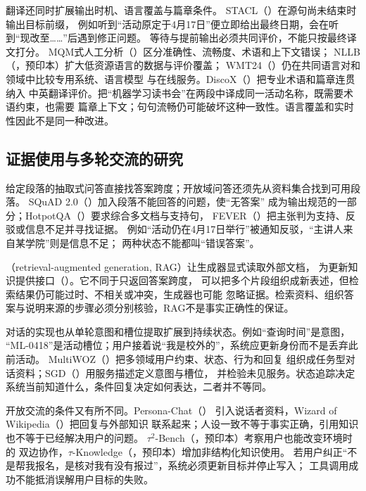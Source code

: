 翻译还同时扩展输出时机、语言覆盖与篇章条件。
STACL（\citeyear{nlp-intro-ma2019stacl}）在源句尚未结束时输出目标前缀，
例如听到“活动原定于4月17日”便立即给出最终日期，会在听到“现改至……”后遇到修正问题。
等待与提前输出必须共同评价，不能只按最终译文打分。
MQM式人工分析（\citeyear{nlp-intro-freitag2021}）区分准确性、流畅度、术语和上下文错误；
NLLB（\citeyear{nlp-intro-nllb2022}，预印本）扩大低资源语言的数据与评价覆盖；
WMT24（\citeyear{nlp-intro-kocmi2024}）仍在共同语言对和领域中比较专用系统、语言模型
与在线服务。DiscoX（\citeyear{nlp-intro-zhao2026discox}）把专业术语和篇章连贯纳入
中英翻译评价。把“机器学习读书会”在两段中译成同一活动名称，既需要术语约束，也需要
篇章上下文；句句流畅仍可能破坏这种一致性。语言覆盖和实时性因此不是同一种改进。

\subsection{证据使用与多轮交流的研究}
\label{sec:nlp-history-evidence-dialogue}

给定段落的抽取式问答直接找答案跨度；开放域问答还须先从资料集合找到可用段落。
SQuAD 2.0（\citeyear{rajpurkar2018squad2}）加入段落不能回答的问题，使“无答案”
成为输出规范的一部分；HotpotQA（\citeyear{yang2018hotpotqa}）要求综合多文档与支持句，
FEVER（\citeyear{nlp-intro-thorne2018}）把主张判为支持、反驳或信息不足并寻找证据。
例如“活动仍在4月17日举行”被通知反驳，“主讲人来自某学院”则是信息不足；
两种状态不能都叫“错误答案”。

（retrieval-augmented generation, RAG）让生成器显式读取外部文档，
为更新知识提供接口（\citeyear{lewis2020rag}）。它不同于只返回答案跨度，
可以把多个片段组织成新表述，但检索结果仍可能过时、不相关或冲突，生成器也可能
忽略证据。检索资料、组织答案与说明来源的步骤必须分别核验，RAG不是事实正确性的保证。

对话的实现也从单轮意图和槽位提取扩展到持续状态。例如“查询时间”是意图，
“ML-0418”是活动槽位；用户接着说“我是校外的”，系统应更新身份而不是丢弃此前活动。
MultiWOZ（\citeyear{budzianowski2018multiwoz}）把多领域用户约束、状态、行为和回复
组织成任务型对话资料；SGD（\citeyear{rastogi2020sgd}）用服务描述定义意图与槽位，
并检验未见服务。状态追踪决定系统当前知道什么，条件回复决定如何表达，二者并不等同。

开放交流的条件又有所不同。Persona-Chat（\citeyear{nlp-intro-zhang2018persona}）
引入说话者资料，Wizard of Wikipedia（\citeyear{nlp-intro-dinan2019}）把回复与外部知识
联系起来；人设一致不等于事实正确，引用知识也不等于已经解决用户的问题。
$\tau^2$-Bench（\citeyear{nlp-intro-barres2025}，预印本）考察用户也能改变环境时的
双边协作，$\tau$-Knowledge（\citeyear{nlp-intro-shi2026}，预印本）增加非结构化知识使用。
若用户纠正“不是帮我报名，是核对我有没有报过”，系统必须更新目标并停止写入；
工具调用成功不能抵消误解用户目标的失败。

